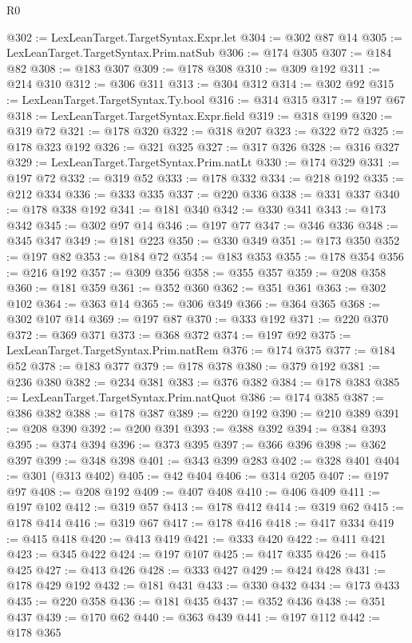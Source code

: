 \begin{lexlean}{R0}
\begin{coremodule}
@302 := LexLeanTarget.TargetSyntax.Expr.let
@304 := @302 @87 @14
@305 := LexLeanTarget.TargetSyntax.Prim.natSub
@306 := @174 @305
@307 := @184 @82
@308 := @183 @307
@309 := @178 @308
@310 := @309 @192
@311 := @214 @310
@312 := @306 @311
@313 := @304 @312
@314 := @302 @92
@315 := LexLeanTarget.TargetSyntax.Ty.bool
@316 := @314 @315
@317 := @197 @67
@318 := LexLeanTarget.TargetSyntax.Expr.field
@319 := @318 @199
@320 := @319 @72
@321 := @178 @320
@322 := @318 @207
@323 := @322 @72
@325 := @178 @323 @192
@326 := @321 @325
@327 := @317 @326
@328 := @316 @327
@329 := LexLeanTarget.TargetSyntax.Prim.natLt
@330 := @174 @329
@331 := @197 @72
@332 := @319 @52
@333 := @178 @332
@334 := @218 @192
@335 := @212 @334
@336 := @333 @335
@337 := @220 @336
@338 := @331 @337
@340 := @178 @338 @192
@341 := @181 @340
@342 := @330 @341
@343 := @173 @342
@345 := @302 @97 @14
@346 := @197 @77
@347 := @346 @336
@348 := @345 @347
@349 := @181 @223
@350 := @330 @349
@351 := @173 @350
@352 := @197 @82
@353 := @184 @72
@354 := @183 @353
@355 := @178 @354
@356 := @216 @192
@357 := @309 @356
@358 := @355 @357
@359 := @208 @358
@360 := @181 @359
@361 := @352 @360
@362 := @351 @361
@363 := @302 @102
@364 := @363 @14
@365 := @306 @349
@366 := @364 @365
@368 := @302 @107 @14
@369 := @197 @87
@370 := @333 @192
@371 := @220 @370
@372 := @369 @371
@373 := @368 @372
@374 := @197 @92
@375 := LexLeanTarget.TargetSyntax.Prim.natRem
@376 := @174 @375
@377 := @184 @52
@378 := @183 @377
@379 := @178 @378
@380 := @379 @192
@381 := @236 @380
@382 := @234 @381
@383 := @376 @382
@384 := @178 @383
@385 := LexLeanTarget.TargetSyntax.Prim.natQuot
@386 := @174 @385
@387 := @386 @382
@388 := @178 @387
@389 := @220 @192
@390 := @210 @389
@391 := @208 @390
@392 := @200 @391
@393 := @388 @392
@394 := @384 @393
@395 := @374 @394
@396 := @373 @395
@397 := @366 @396
@398 := @362 @397
@399 := @348 @398
@401 := @343 @399 @283
@402 := @328 @401
@404 := @301 (@313 @402)
@405 := @42 @404
@406 := @314 @205
@407 := @197 @97
@408 := @208 @192
@409 := @407 @408
@410 := @406 @409
@411 := @197 @102
@412 := @319 @57
@413 := @178 @412
@414 := @319 @62
@415 := @178 @414
@416 := @319 @67
@417 := @178 @416
@418 := @417 @334
@419 := @415 @418
@420 := @413 @419
@421 := @333 @420
@422 := @411 @421
@423 := @345 @422
@424 := @197 @107
@425 := @417 @335
@426 := @415 @425
@427 := @413 @426
@428 := @333 @427
@429 := @424 @428
@431 := @178 @429 @192
@432 := @181 @431
@433 := @330 @432
@434 := @173 @433
@435 := @220 @358
@436 := @181 @435
@437 := @352 @436
@438 := @351 @437
@439 := @170 @62
@440 := @363 @439
@441 := @197 @112
@442 := @178 @365

\end{coremodule}
\end{lexlean}
